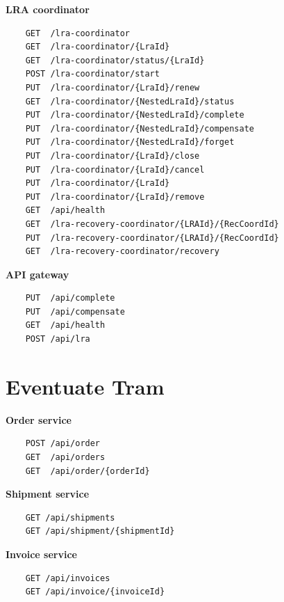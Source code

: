 \documentclass[oneside,
  digital, %
  table,   %
  nolof,     %
  nolot,     %
]{fithesis3}
\begin{document}
\noindent
\textbf{LRA coordinator}

\begin{verbatim}
    GET  /lra-coordinator
    GET  /lra-coordinator/{LraId}
    GET  /lra-coordinator/status/{LraId}
    POST /lra-coordinator/start
    PUT  /lra-coordinator/{LraId}/renew
    GET  /lra-coordinator/{NestedLraId}/status
    PUT  /lra-coordinator/{NestedLraId}/complete
    PUT  /lra-coordinator/{NestedLraId}/compensate
    PUT  /lra-coordinator/{NestedLraId}/forget
    PUT  /lra-coordinator/{LraId}/close
    PUT  /lra-coordinator/{LraId}/cancel
    PUT  /lra-coordinator/{LraId}
    PUT  /lra-coordinator/{LraId}/remove
    GET  /api/health
    GET  /lra-recovery-coordinator/{LRAId}/{RecCoordId}
    PUT  /lra-recovery-coordinator/{LRAId}/{RecCoordId}
    GET  /lra-recovery-coordinator/recovery
\end{verbatim}

\noindent
\textbf{API gateway}

\begin{verbatim}
    PUT  /api/complete
    PUT  /api/compensate
    GET  /api/health
    POST /api/lra
\end{verbatim}


\section{Eventuate Tram}

\textbf{Order service}

\begin{verbatim}
    POST /api/order
    GET  /api/orders
    GET  /api/order/{orderId}
\end{verbatim}

\noindent
\textbf{Shipment service}

\begin{verbatim}
    GET /api/shipments
    GET /api/shipment/{shipmentId}
\end{verbatim}

\noindent
\textbf{Invoice service}

\begin{verbatim}
    GET /api/invoices
    GET /api/invoice/{invoiceId}
\end{verbatim}
\end{document}
